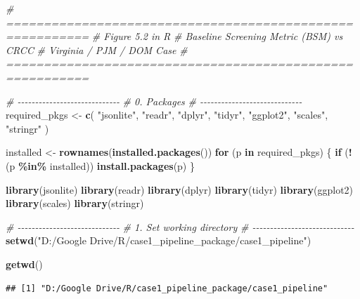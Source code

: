 \documentclass[
]{article}
\newenvironment{Shaded}{\begin{snugshade}}{\end{snugshade}}
\newcommand{\CommentTok}[1]{\textcolor[rgb]{0.56,0.35,0.01}{\textit{#1}}}
\newcommand{\ControlFlowTok}[1]{\textcolor[rgb]{0.13,0.29,0.53}{\textbf{#1}}}
\newcommand{\FunctionTok}[1]{\textcolor[rgb]{0.13,0.29,0.53}{\textbf{#1}}}
\newcommand{\NormalTok}[1]{#1}
\newcommand{\OtherTok}[1]{\textcolor[rgb]{0.56,0.35,0.01}{#1}}
\newcommand{\SpecialCharTok}[1]{\textcolor[rgb]{0.81,0.36,0.00}{\textbf{#1}}}
\newcommand{\StringTok}[1]{\textcolor[rgb]{0.31,0.60,0.02}{#1}}
\begin{document}
\begin{Shaded}
\begin{Highlighting}[]
\CommentTok{\# =========================================================}
\CommentTok{\# Figure 5.2 in R}
\CommentTok{\# Baseline Screening Metric (BSM) vs CRCC}
\CommentTok{\# Virginia / PJM / DOM Case}
\CommentTok{\# =========================================================}

\CommentTok{\# {-}{-}{-}{-}{-}{-}{-}{-}{-}{-}{-}{-}{-}{-}{-}{-}{-}{-}{-}{-}{-}{-}{-}{-}{-}{-}{-}{-}{-}}
\CommentTok{\# 0. Packages}
\CommentTok{\# {-}{-}{-}{-}{-}{-}{-}{-}{-}{-}{-}{-}{-}{-}{-}{-}{-}{-}{-}{-}{-}{-}{-}{-}{-}{-}{-}{-}{-}}
\NormalTok{required\_pkgs }\OtherTok{\textless{}{-}} \FunctionTok{c}\NormalTok{(}
  \StringTok{"jsonlite"}\NormalTok{, }\StringTok{"readr"}\NormalTok{, }\StringTok{"dplyr"}\NormalTok{, }\StringTok{"tidyr"}\NormalTok{, }\StringTok{"ggplot2"}\NormalTok{, }\StringTok{"scales"}\NormalTok{, }\StringTok{"stringr"}
\NormalTok{)}

\NormalTok{installed }\OtherTok{\textless{}{-}} \FunctionTok{rownames}\NormalTok{(}\FunctionTok{installed.packages}\NormalTok{())}
\ControlFlowTok{for}\NormalTok{ (p }\ControlFlowTok{in}\NormalTok{ required\_pkgs) \{}
  \ControlFlowTok{if}\NormalTok{ (}\SpecialCharTok{!}\NormalTok{(p }\SpecialCharTok{\%in\%}\NormalTok{ installed)) }\FunctionTok{install.packages}\NormalTok{(p)}
\NormalTok{\}}

\FunctionTok{library}\NormalTok{(jsonlite)}
\FunctionTok{library}\NormalTok{(readr)}
\FunctionTok{library}\NormalTok{(dplyr)}
\FunctionTok{library}\NormalTok{(tidyr)}
\FunctionTok{library}\NormalTok{(ggplot2)}
\FunctionTok{library}\NormalTok{(scales)}
\FunctionTok{library}\NormalTok{(stringr)}

\CommentTok{\# {-}{-}{-}{-}{-}{-}{-}{-}{-}{-}{-}{-}{-}{-}{-}{-}{-}{-}{-}{-}{-}{-}{-}{-}{-}{-}{-}{-}{-}}
\CommentTok{\# 1. Set working directory}
\CommentTok{\# {-}{-}{-}{-}{-}{-}{-}{-}{-}{-}{-}{-}{-}{-}{-}{-}{-}{-}{-}{-}{-}{-}{-}{-}{-}{-}{-}{-}{-}}
\FunctionTok{setwd}\NormalTok{(}\StringTok{"D:/Google Drive/R/case1\_pipeline\_package/case1\_pipeline"}\NormalTok{)}

\FunctionTok{getwd}\NormalTok{()}
\end{Highlighting}
\end{Shaded}

\begin{verbatim}
## [1] "D:/Google Drive/R/case1_pipeline_package/case1_pipeline"
\end{verbatim}
\end{document}
